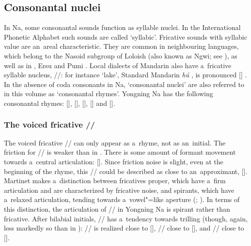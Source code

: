 	\subsection{Consonantal nuclei}
	\label{sec:consonantalnuclei}
	
	In Na, some consonantal sounds function as syllable nuclei. In the International Phonetic Alphabet such
	sounds are called ‘syllabic’. Fricative sounds with syllabic value
	are an~areal characteristic. They are common in neighbouring  languages, which
	belong to the {Nasoid} subgroup of Loloish (also known as Ngwi; see \citealt[70]{bradley1979}), as well as in  \citep{chirkovaetal2012}, Ersu \citep{chirkovaersu2015} and Pumi \citep[52]{daudey2014}. Local
	dialects of {Mandarin} also have a~fricative syllable nucleus, //: for instance ‘lake’, Standard {Mandarin}
	\textit{hú} , is pronounced [] \citep[on Southwestern Mandarin: see][]{guiyunnanese2001, pinson2008}. In the absence of coda consonants in Na, ‘consonantal
	nuclei’ are also referred to in this volume as ‘consonantal rhymes’. Yongning Na has the following consonantal
	rhymes: [], [], [], [] and [].
	

	\subsubsection{The voiced fricative //}
	\label{sec:thevoicedfricative}
	
	The voiced fricative // can only appear as a~rhyme, not as an~initial. The
	friction for // is weaker than in . There is some amount of formant movement towards
	a~central articulation: []. Since friction noise is slight, even at the beginning of the
	rhyme, this // could be described as close to an~approximant, []. Martinet makes
	a~distinction between fricatives proper, which have a~firm articulation and are characterized by
	fricative noise, and spirants, which have a~relaxed articulation, tending towards a~vowel"=like
	aperture (\citealt[24]{martinet1956}; \citeyear{martinet1981}). In terms of this distinction, the articulation of // in
	Yongning Na is spirant rather than fricative. After bilabial initials, // has a~tendency
	towards trilling (though, again, less markedly so than in ): // is realized close to
	[], // close to [], and // close to [].
	
